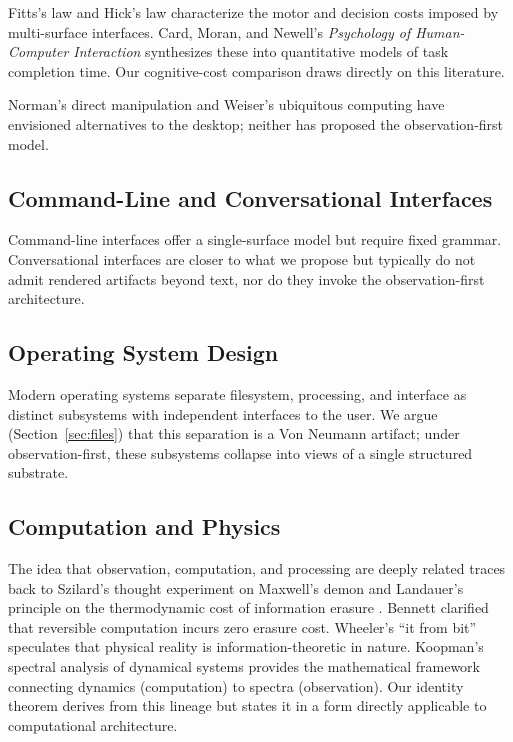 \documentclass[11pt,a4paper]{article}
\theoremstyle{definition}
\theoremstyle{remark}
\begin{document}
Fitts's law \citep{fitts1954information} and Hick's law \citep{hick1952rate} characterize the motor and decision costs imposed by multi-surface interfaces. Card, Moran, and Newell's \emph{Psychology of Human-Computer Interaction} \citep{card1983psychology} synthesizes these into quantitative models of task completion time. Our cognitive-cost comparison draws directly on this literature.

Norman's direct manipulation \citep{norman1986cognitive, hutchins1985direct} and Weiser's ubiquitous computing \citep{weiser1991computer} have envisioned alternatives to the desktop; neither has proposed the observation-first model.

\subsection{Command-Line and Conversational Interfaces}

Command-line interfaces \citep{ritchie1978unix} offer a single-surface model but require fixed grammar. Conversational interfaces \citep{mctear2020conversational} are closer to what we propose but typically do not admit rendered artifacts beyond text, nor do they invoke the observation-first architecture.

\subsection{Operating System Design}

Modern operating systems \citep{tanenbaum2014modern, silberschatz2018operating} separate filesystem, processing, and interface as distinct subsystems with independent interfaces to the user. We argue (Section~\ref{sec:files}) that this separation is a Von Neumann artifact; under observation-first, these subsystems collapse into views of a single structured substrate.

\subsection{Computation and Physics}

The idea that observation, computation, and processing are deeply related traces back to Szilard's thought experiment on Maxwell's demon \citep{szilard1929entropieverminderung} and Landauer's principle on the thermodynamic cost of information erasure \citep{landauer1961irreversibility}. Bennett \citep{bennett1982thermodynamics} clarified that reversible computation incurs zero erasure cost. Wheeler's ``it from bit'' \citep{wheeler1990information} speculates that physical reality is information-theoretic in nature. Koopman's spectral analysis of dynamical systems \citep{koopman1931hamiltonian, mezic2005spectral} provides the mathematical framework connecting dynamics (computation) to spectra (observation). Our identity theorem derives from this lineage but states it in a form directly applicable to computational architecture.
\end{document}
